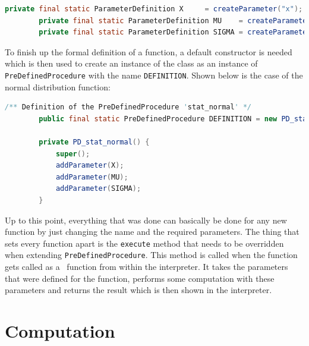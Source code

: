 \begin{center}
	\begin{lstlisting}[caption={Parameter Definition}, language={java}, label=lis:parameterDefinition]
		private final static ParameterDefinition X     = createParameter("x");
		private final static ParameterDefinition MU    = createParameter("mu");
		private final static ParameterDefinition SIGMA = createParameter("sigma");
	\end{lstlisting}
\end{center}

To finish up the formal definition of a function, a default constructor is needed which is then used to create an instance of the class as an instance of \lstinline{PreDefinedProcedure} with the name \lstinline{DEFINITION}. Shown below is the case of the normal distribution function:

\begin{center}
	\begin{lstlisting}[caption={Constructor and Function Definition}, language={java}, label=lis:constructor]
		/** Definition of the PreDefinedProcedure 'stat_normal' */
		public final static PreDefinedProcedure DEFINITION = new PD_stat_normal();

		private PD_stat_normal() {
			super();
			addParameter(X);
			addParameter(MU);
			addParameter(SIGMA);
		}
	\end{lstlisting}
\end{center}

Up to this point, everything that was done can basically be done for any new function by just changing the name and the required parameters. The thing that sets every function apart is the \lstinline{execute} method that needs to be overridden when extending \lstinline{PreDefinedProcedure}. This method is called when the function gets called as a \setlx\ function from within the interpreter. It takes the parameters that were defined for the function, performs some computation with these parameters and returns the result which is then shown in the interpreter.

\section{Computation}

